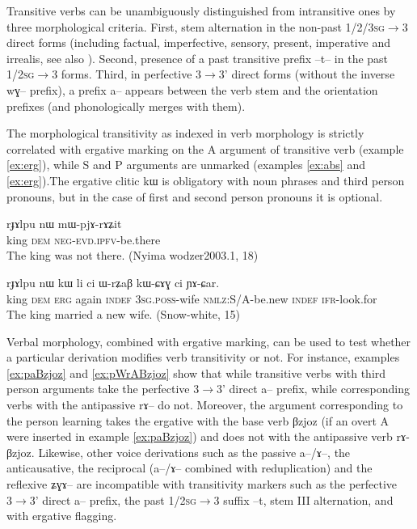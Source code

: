 \documentclass[oldfontcommands,oneside,a4paper,11pt]{article}
\newcommand{\ipa}[1]{{\phon \mbox{#1}}} %
\begin{document}
Transitive verbs can be unambiguously distinguished from intransitive ones by three morphological criteria. First, stem alternation in the non-past  \textsc{1/2/3sg}$\rightarrow$3 direct forms (including factual, imperfective, sensory, present, imperative and irrealis, see also \citealt{jackson00puxi,jackson07irrealis}). Second, presence of a past transitive prefix \ipa{--t--} in the past \textsc{1/2sg}$\rightarrow$3 forms. Third, in perfective 3$\rightarrow$3' direct forms (without the inverse \ipa{wɣ--} prefix), a prefix \ipa{a--}  appears between the verb stem and the orientation prefixes (and phonologically merges with them).

The morphological transitivity as indexed in verb morphology is strictly correlated with ergative marking on the A argument of transitive verb (example   \ref{ex:erg}), while S and P arguments are unmarked (examples \ref{ex:abs} and \ref{ex:erg}).The ergative clitic \ipa{kɯ} is obligatory with noun phrases and third person pronouns, but in the case of first and second person pronouns it is optional.  

 \begin{exe}
\ex \label{ex:abs}
\gll
\ipa{rɟɤlpu}  	\ipa{nɯ}  	\ipa{mɯ-pjɤ-rɤʑit}  \\
king \textsc{dem} \textsc{neg-evd.ipfv}-be.there \\
 \glt The king was not there. (Nyima wodzer2003.1, 18)
\end{exe}

 \begin{exe}
\ex \label{ex:erg}
\gll 
\ipa{rɟɤlpu}  	\ipa{nɯ}  	\ipa{kɯ}  	\ipa{li}  	\ipa{ci}  	\ipa{ɯ-rʑaβ}  	\ipa{kɯ-ɕɤɣ}  	\ipa{ci}  	\ipa{ɲɤ-ɕar.}  	 \\
king \textsc{dem} \textsc{erg} again \textsc{indef} \textsc{3sg.poss}-wife \textsc{nmlz}:S/A-be.new \textsc{indef}  \textsc{ifr}-look.for \\
\glt The king married a new wife. (Snow-white, 15)
\end{exe}

Verbal morphology, combined with ergative marking, can be used to test whether a particular derivation modifies verb transitivity or not. For instance, examples \ref{ex:paBzjoz} and \ref{ex:pWrABzjoz} show that while transitive verbs with third person arguments take the perfective $3\rightarrow$3' direct \ipa{a--} prefix, while corresponding verbs with the antipassive \ipa{rɤ--} do not. Moreover, the argument corresponding to the person learning takes the ergative with the base verb \ipa{βzjoz} (if an overt A were inserted in example \ref{ex:paBzjoz}) and does not with the antipassive verb \ipa{rɤ-βzjoz}. Likewise, other voice derivations such as the passive \ipa{a--/ɤ--}, the anticausative, the reciprocal (\ipa{a--/ɤ--} combined with reduplication) and the reflexive \ipa{ʑɣɤ--}  are incompatible with transitivity markers such as the perfective $3\rightarrow$3' direct \ipa{a--} prefix, the past \textsc{1/2sg}$\rightarrow$3 suffix \ipa{--t}, stem III alternation, and with ergative flagging.
\end{document}
